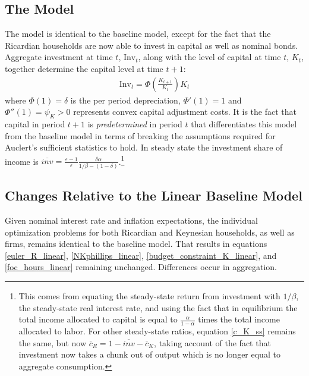 \documentclass[titlepage]{\econtex}\newcommand{\texname}{ConsumptionHeterogeneity}
\begin{document}
\subsection{The Model}
The model is identical to the baseline model, except for the fact that the Ricardian households are now able to invest in capital as well as nominal bonds. Aggregate investment at time $t$, $\text{Inv}_t$, along with the level of capital at time $t$, $K_t$, together determine the capital level at time $t+1$:
\begin{align}
\text{Inv}_t = \Phi\left(\frac{K_{t+1}}{K_t}\right) K_t
\end{align}
where $\Phi(1) =\delta$ is the per period depreciation, $\Phi'(1) =1$ and $\Phi''(1) =\psi_K >0 $ represents convex capital adjustment costs. It is the fact that capital in period $t+1$ is \textit{predetermined} in period $t$ that differentiates this model from the baseline model in terms of breaking the assumptions required for Auclert's sufficient statistics to hold. In steady state the investment share of income is $\overline{\textit{inv}} = \frac{\varepsilon-1}{\varepsilon} \frac{\delta \alpha}{1/\beta - (1-\delta)}$.\footnote{This comes from equating the steady-state return from investment with $1/\beta$, the steady-state real interest rate, and using the fact that in equilibrium the total income allocated to capital is equal to $\frac{\alpha}{1-\alpha}$ times the total income allocated to labor. For other steady-state ratios, equation \ref{c_K_ss} remains the same, but now $\overline{c}_{R}=1-\overline{\textit{inv}}-\overline{c}_{K}$, taking account of the fact that investment now takes a chunk out of output which is no longer equal to aggregate consumption.}

\subsection{Changes Relative to the Linear Baseline Model}
Given nominal interest rate and inflation expectations, the individual optimization problems for both Ricardian and Keynesian households, as well as firms, remains identical to the baseline model. That results in equations \ref{euler_R_linear}, \ref{NKphillips_linear}, \ref{budget_constraint_K_linear}, and \ref{foc_hours_linear} remaining unchanged. Differences occur in aggregation.
\end{document}

